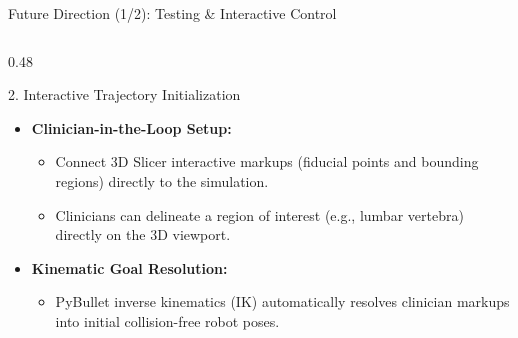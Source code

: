 \documentclass[aspectratio=169, 10pt]{beamer}
\begin{document}
\begin{frame}{Future Direction (1/2): Testing \& Interactive Control}
\begin{columns}[T]
        \begin{column}{0.48\textwidth}
            \begin{block}{2. Interactive Trajectory Initialization}
                \begin{itemize}\itemsep=3pt
                    \item \textbf{Clinician-in-the-Loop Setup:}
                    \begin{itemize}\itemsep=1pt
                        \item Connect 3D Slicer interactive markups (fiducial points and bounding regions) directly to the simulation.
                        \item Clinicians can delineate a region of interest (e.g., lumbar vertebra) directly on the 3D viewport.
                    \end{itemize}
                    \item \textbf{Kinematic Goal Resolution:}
                    \begin{itemize}\itemsep=1pt
                        \item PyBullet inverse kinematics (IK) automatically resolves clinician markups into initial collision-free robot poses.
                    \end{itemize}
                \end{itemize}
            \end{block}
        \end{column}
    \end{columns}
\end{frame}
\end{document}
